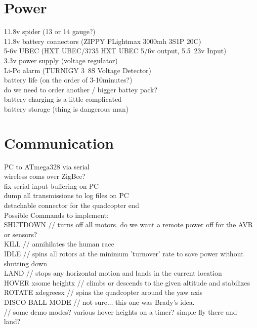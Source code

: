\documentclass{article}
\begin{document}
\section{Power}
11.8v spider (13 or 14 gauge?)\\
11.8v battery connectors (ZIPPY FLightmax 3000mh 3S1P 20C)\\
5-6v UBEC (HXT UBEC/3735 HXT UBEC 5/6v output, 5.5~23v Input) \\
3.3v power supply (voltage regulator)\\
Li-Po alarm (TURNIGY 3~8S Voltage Detector)\\
battery life (on the order of 3-10minutes?)\\
do we need to order another / bigger battey pack?\\
battery charging is a little complicated\\
battery storage (thing is dangerous man)\\

\section{Communication}
PC to ATmega328 via serial\\
wireless coms over ZigBee?\\

fix serial input buffering on PC\\
dump all transmissions to log files on PC\\
detachable connector for the quadcopter end\\

Possible Commands to implement:\\

SHUTDOWN // turns off all motors.  do we want a remote power off for the AVR or sensors?\\
KILL // annihilates the human race\\
IDLE // spins all rotors at the minimum 'turnover' rate to save power without shutting down\\
LAND // stops any horizontal motion and lands in the current location\\
HOVER xsome heightx  // climbs or descends to the given altitude and stabilizes\\
ROTATE xdegreesx    // spins the quadcopter around the yaw axis\\
DISCO BALL MODE      // not sure... this one was Brady's idea.\\
// some demo modes? various hover heights on a timer?  simple fly there and land?\\
\end{document}
